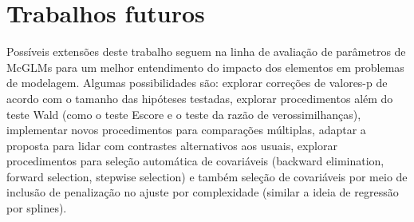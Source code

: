 
\section{Trabalhos futuros}

Possíveis extensões deste trabalho seguem na linha de avaliação de parâmetros de McGLMs para um melhor entendimento do impacto dos elementos em problemas de modelagem. Algumas possibilidades são: explorar correções de valores-p de acordo com o tamanho das hipóteses testadas, explorar procedimentos além do teste Wald (como o teste Escore e o teste da razão de verossimilhanças), implementar novos procedimentos para comparações múltiplas, adaptar a proposta para lidar com contrastes alternativos aos usuais, explorar procedimentos para seleção automática de covariáveis (backward elimination, forward selection, stepwise selection) e também seleção de covariáveis por meio de inclusão de penalização no ajuste por complexidade (similar a ideia de regressão por splines).


